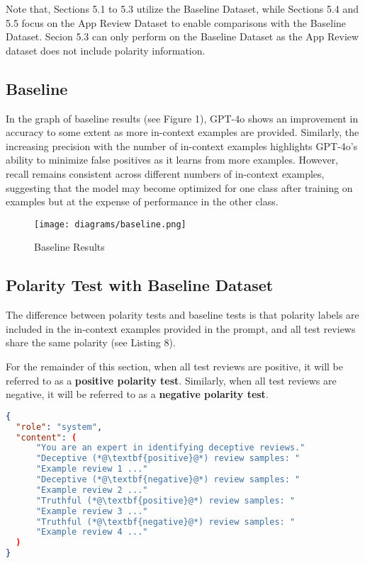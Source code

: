 \documentclass[sigconf, nonacm]{acmart}
\theoremstyle{definition}
\begin{document}
Note that, Sections 5.1 to 5.3 utilize the Baseline Dataset, while Sections 5.4 and 5.5 focus on the App Review Dataset to enable comparisons with the Baseline Dataset. Secion 5.3 can only perform on the Baseline Dataset as the App Review dataset does not include polarity information.

\subsection{Baseline}
In the graph of baseline results (see Figure 1), GPT-4o shows an improvement in accuracy to some extent as more in-context examples are provided. Similarly, the increasing precision with the number of in-context examples highlights GPT-4o's ability to minimize false positives as it learns from more examples. However, recall remains consistent across different numbers of in-context examples, suggesting that the model may become optimized for one class after training on examples but at the expense of performance in the other class.

\begin{figure}[h]
  \centering
  \texttt{[image: diagrams/baseline.png]}
  \caption{Baseline Results}
\end{figure}

\subsection{Polarity Test with Baseline Dataset}
The difference between polarity tests and baseline tests is that polarity labels are included in the in-context examples provided in the prompt, and all test reviews share the same polarity (see Listing 8).

For the remainder of this section, when all test reviews are positive, it will be referred to as a \textbf{positive polarity test}. Similarly, when all test reviews are negative, it will be referred to as a \textbf{negative polarity test}.

\begin{lstlisting}[language=json, caption={System Messages for Polarity Test}]
{
  "role": "system",
  "content": (
      "You are an expert in identifying deceptive reviews."
      "Deceptive (*@\textbf{positive}@*) review samples: "
      "Example review 1 ..."
      "Deceptive (*@\textbf{negative}@*) review samples: "
      "Example review 2 ..."
      "Truthful (*@\textbf{positive}@*) review samples: "
      "Example review 3 ..."
      "Truthful (*@\textbf{negative}@*) review samples: "
      "Example review 4 ..."
  )
}
\end{lstlisting}
\end{document}
